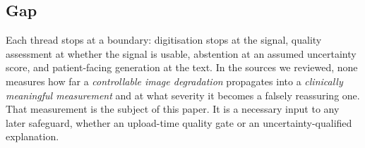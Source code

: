 \subsection{Gap}
Each thread stops at a boundary: digitisation stops at the signal, quality assessment at whether the signal is usable, abstention at an assumed uncertainty score, and patient-facing generation at the text. In the sources we reviewed, none measures how far a \emph{controllable image degradation} propagates into a \emph{clinically meaningful measurement} and at what severity it becomes a falsely reassuring one. That measurement is the subject of this paper. It is a necessary input to any later safeguard, whether an upload-time quality gate or an uncertainty-qualified explanation.
